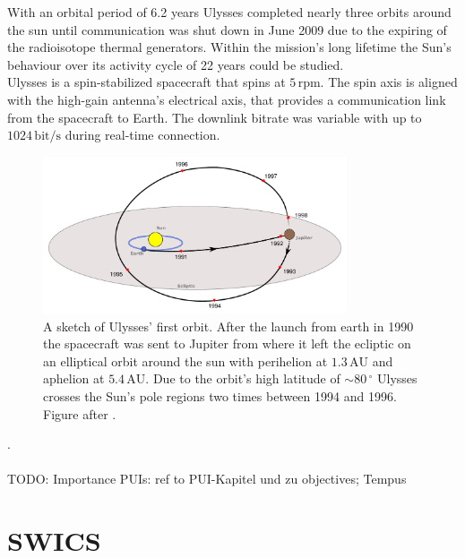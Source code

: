 With an orbital period of 6.2 years Ulysses completed nearly three orbits around the sun until communication was shut down in June 2009 due to the expiring of the radioisotope thermal generators.
Within the mission's long lifetime the Sun's behaviour over its activity cycle of 22 years could be studied.\\
Ulysses is a spin-stabilized spacecraft that spins at $5\,\mathrm{rpm}$. The spin axis is aligned with the high-gain antenna's electrical axis, that provides a communication link from the spacecraft to Earth. The downlink bitrate was variable with up to $1024\,\mathrm{bit/s}$ during real-time connection.
\begin{figure}[h]
	\includegraphics[width=0.8\textwidth]{Figures/ulysses_trajectory.pdf}
	\centering
	\caption{A sketch of Ulysses' first orbit. After the launch from earth in 1990 the spacecraft was sent to Jupiter from where it left the ecliptic on an elliptical orbit around the sun with perihelion at $1.3\,\mathrm{AU}$ and aphelion at $5.4\,\mathrm{AU}$. Due to the orbit's high latitude of $\sim 80 \, ^\circ$ Ulysses crosses the Sun's pole regions two times between 1994 and 1996. Figure after \citet{esa_orbit}.}
	\label{fig:trajectory}
\end{figure}
.
\\ \\ 
TODO: Importance PUIs: ref to PUI-Kapitel und zu objectives; Tempus
%
%
%
%
%
\section{SWICS}
\label{sec:swics}



